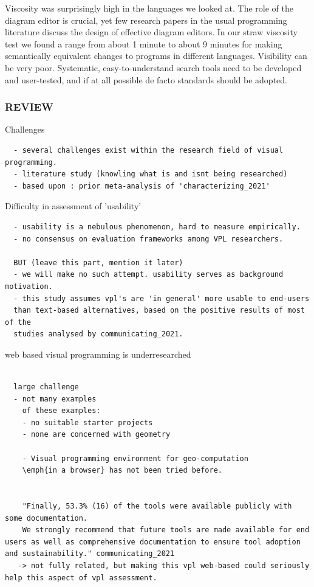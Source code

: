 Viscosity was surprisingly high in the languages we looked at. The role of the diagram editor is crucial, yet few research papers in the usual programming literature discuss the design of effective diagram editors. In our straw viscosity test we found a range from about 1 minute to about 9 minutes for making semantically equivalent changes to programs in different languages. Visibility can be very poor. Systematic, easy-to-understand search tools need to be developed and user-tested, and if at all possible de facto standards should be adopted.

\subsubsection*{REVIEW}
Challenges
\begin{lstlisting}
  - several challenges exist within the research field of visual programming. 
  - literature study (knowling what is and isnt being researched)
  - based upon : prior meta-analysis of 'characterizing_2021'
\end{lstlisting}

Difficulty in assessment of 'usability'
\begin{lstlisting}
  - usability is a nebulous phenomenon, hard to measure empirically.
  - no consensus on evaluation frameworks among VPL researchers. 

  BUT (leave this part, mention it later)
  - we will make no such attempt. usability serves as background motivation. 
  - this study assumes vpl's are 'in general' more usable to end-users 
  than text-based alternatives, based on the positive results of most of the 
  studies analysed by communicating_2021.   
\end{lstlisting}

web based visual programming is underresearched
\begin{lstlisting}
  
  large challenge
  - not many examples
    of these examples: 
    - no suitable starter projects
    - none are concerned with geometry

    - Visual programming environment for geo-computation 
    \emph{in a browser} has not been tried before. 


    "Finally, 53.3% (16) of the tools were available publicly with some documentation. 
    We strongly recommend that future tools are made available for end users as well as comprehensive documentation to ensure tool adoption and sustainability." communicating_2021 
   -> not fully related, but making this vpl web-based could seriously help this aspect of vpl assessment.   

\end{lstlisting}

